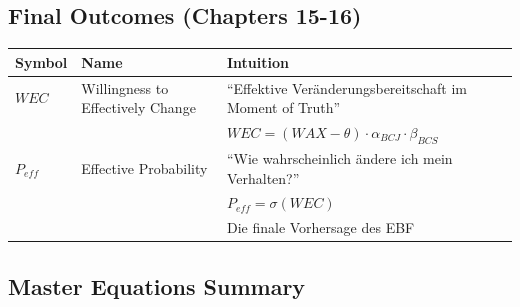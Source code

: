 \subsection{Final Outcomes (Chapters 15-16)}

\begin{longtable}{p{2cm}p{4cm}p{7cm}}
\toprule
\textbf{Symbol} & \textbf{Name} & \textbf{Intuition} \\
\midrule
\endhead

$WEC$ & Willingness to Effectively Change & 
``Effektive Veränderungsbereitschaft im Moment of Truth'' \\
& & $WEC = (WAX - \theta) \cdot \alpha_{BCJ} \cdot \beta_{BCS}$ \\[6pt]

$P_{eff}$ & Effective Probability & 
``Wie wahrscheinlich ändere ich mein Verhalten?'' \\
& & $P_{eff} = \sigma(WEC)$ \\
& & Die finale Vorhersage des EBF \\[6pt]

\bottomrule
\end{longtable}

\subsection{Master Equations Summary}

